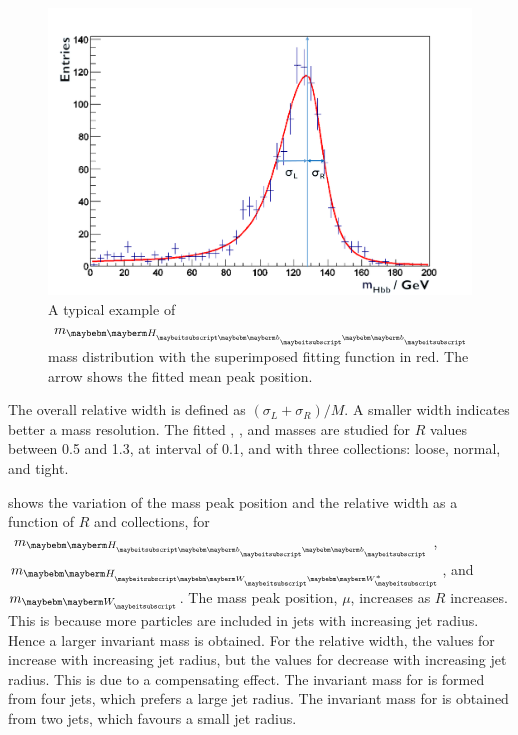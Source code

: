 \begin{figure}[!htbp]
\includegraphics[width=\largefigwidth]{doubleHiggs/MCmassFit2}
\caption[Example MC mass fit for jet optimisation in double Higgs analysis]%
   {A typical example of  $m_{\Hbb}$  mass distribution with the superimposed fitting function in red. The arrow shows the fitted mean peak position.}
   \label{fig:doubleHiggsFitMCMass}
\end{figure}


The overall relative width is defined as $\left(\sigma_L  + \sigma_R\right)/M$. A smaller width indicates better a mass resolution. The fitted \Hbb, \HWW, and \PW masses are studied for $R$ values between 0.5 and 1.3, at interval of 0.1, and with three \PFO collections: loose, normal, and tight.


 shows the variation of the mass peak position and the relative width as a function of $R$ and \PFO collections, for $m_{\Hbb}$, $m_{\HWW}$, and $m_{\PW}$. The mass peak position, $\mu$, increases as $R$ increases. This is because more particles are included in jets with increasing jet radius. Hence a larger invariant mass is obtained. For the relative width, the values for \Hbb  increase with increasing jet radius, but the values for \HWW decrease  with increasing jet radius. This is due to a compensating effect. The invariant mass for \HWW is formed from four jets, which prefers a large jet radius. The invariant mass for \HWW is obtained from two jets, which favours a small jet radius.

